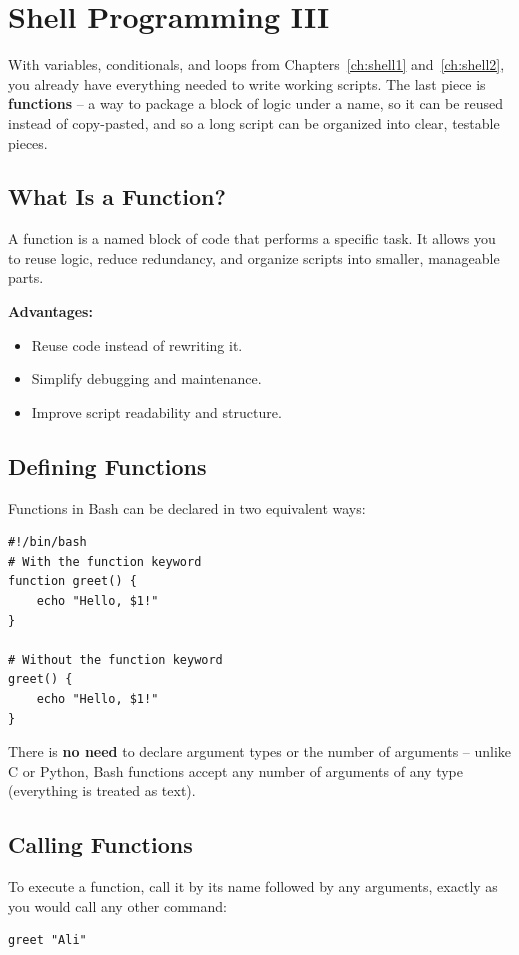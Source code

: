 
\chapter{Shell Programming III}
\label{ch:shell3}

With variables, conditionals, and loops from Chapters~\ref{ch:shell1} and~\ref{ch:shell2}, you already have everything needed to write working scripts. The last piece is \textbf{functions} -- a way to package a block of logic under a name, so it can be reused instead of copy-pasted, and so a long script can be organized into clear, testable pieces.

\section{What Is a Function?}
A function is a named block of code that performs a specific task. It allows you to reuse logic, reduce redundancy, and organize scripts into smaller, manageable parts.

\textbf{Advantages:}
\begin{itemize}
    \item Reuse code instead of rewriting it.
    \item Simplify debugging and maintenance.
    \item Improve script readability and structure.
\end{itemize}

\section{Defining Functions}
Functions in Bash can be declared in two equivalent ways:
\begin{lstlisting}[language=Terminal]
#!/bin/bash
# With the function keyword
function greet() {
    echo "Hello, $1!"
}

# Without the function keyword
greet() {
    echo "Hello, $1!"
}
\end{lstlisting}
There is \textbf{no need} to declare argument types or the number of arguments -- unlike C or Python, Bash functions accept any number of arguments of any type (everything is treated as text).

\section{Calling Functions}
To execute a function, call it by its name followed by any arguments, exactly as you would call any other command:
\begin{lstlisting}[language=Terminal]
greet "Ali"
\end{lstlisting}

